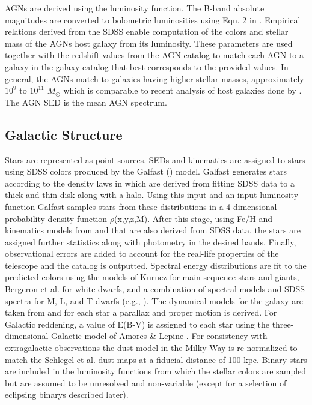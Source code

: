 \documentclass[]{article}
\begin{document}
AGNs are derived using the \cite{bongiorno12} luminosity function. The
B-band absolute magnitudes are converted to bolometric luminosities
using Eqn. 2 in \cite{hopkins07}. Empirical relations derived from the
SDSS enable computation of the colors and stellar mass of the AGNs
host galaxy from its luminosity. These parameters are used together
with the redshift values from the AGN catalog to match each AGN to a
galaxy in the galaxy catalog that best corresponds to the provided
values. In general, the AGNs match to galaxies having higher stellar
masses, approximately $10^{9}$ to $10^{11}$ $M_{\odot}$ which is
comparable to recent analysis of host galaxies done by \cite{xue11}. The
AGN SED is the \cite{vandenberk} mean AGN spectrum. 

\subsection{Galactic Structure \label{sec:stars}}

Stars are represented as point sources.  SEDs and kinematics are
assigned to stars using SDSS colors produced by the Galfast
(\cite{galfast}) model.  Galfast generates stars according to the
density laws in \cite{juric} which are derived from fitting SDSS data
to a thick and thin disk along with a halo. Using this input and an
input luminosity function Galfast samples stars from these
distributions in a 4-dimensional probability density function
$\rho$(x,y,z,M). After this stage, using Fe/H and kinematics models
from \cite{ivezic08} and \cite{bond09} that are also derived from SDSS
data, the stars are assigned further statistics along with photometry
in the desired bands. Finally, observational errors are added to
account for the real-life properties of the telescope and the catalog
is outputted. Spectral energy distributions are fit to the predicted
colors using the models of Kurucz \cite{kurucz93} for main sequence
stars and giants, Bergeron et al. \cite{bergeron95} for white dwarfs,
and a combination of spectral models and SDSS spectra for M, L, and T
dwarfs (e.g.,
\cite{cushing05,bochanski07,burrows06,pettersen89,kowalski10}). The
dynamical models for the galaxy are taken from \cite{bond09} 
and for each star a parallax and proper motion is
derived. For Galactic reddening, a value of E(B-V) is assigned to each
star using the three-dimensional Galactic model of Amores \& Lepine
\cite{amores05}. For consistency with extragalactic observations the
dust model in the Milky Way is re-normalized to match the Schlegel et
al. \cite{schlegel98} dust maps at a fiducial distance of 100 kpc.
Binary stars are included in the luminosity functions from which the
stellar colors are sampled but are assumed to be unresolved and
non-variable (except for a selection of eclipsing binarys described
later).
\end{document}
